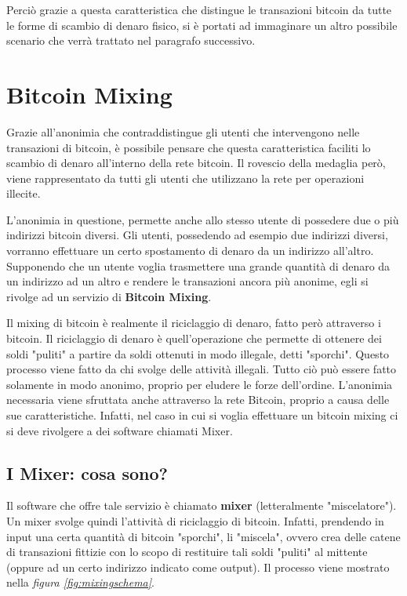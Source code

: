Perciò grazie a questa caratteristica che distingue le transazioni bitcoin da tutte le forme di scambio di denaro fisico, si è portati ad immaginare un altro possibile scenario che verrà trattato nel paragrafo successivo.

\section{Bitcoin Mixing}

Grazie all'anonimia che contraddistingue gli utenti che intervengono nelle transazioni di bitcoin, è possibile pensare che questa caratteristica faciliti lo scambio di denaro all'interno della rete bitcoin. Il rovescio della medaglia però, viene rappresentato da tutti gli utenti che utilizzano la rete per operazioni illecite.

L'anonimia in questione, permette anche allo stesso utente di possedere due o più indirizzi bitcoin diversi. Gli utenti, possedendo ad esempio due indirizzi diversi, vorranno effettuare un certo spostamento di denaro da un indirizzo all'altro. Supponendo che un utente voglia trasmettere una grande quantità di denaro da un indirizzo ad un altro e rendere le transazioni ancora più anonime, egli si rivolge ad un servizio di \textbf{Bitcoin Mixing}.

Il mixing di bitcoin è realmente il riciclaggio di denaro, fatto però attraverso i bitcoin. Il riciclaggio di denaro è quell'operazione che permette di ottenere dei soldi "puliti" a partire da soldi ottenuti in modo illegale, detti "sporchi". Questo processo viene fatto da chi svolge delle attività illegali. Tutto ciò può essere fatto solamente in modo anonimo, proprio per eludere le forze dell'ordine. L'anonimia necessaria viene sfruttata anche attraverso la rete Bitcoin, proprio a causa delle sue caratteristiche. Infatti, nel caso in cui si voglia effettuare un bitcoin mixing ci si deve rivolgere a dei software chiamati Mixer.

\subsection{I Mixer: cosa sono?}

Il software che offre tale servizio è chiamato \textbf{mixer} (letteralmente "miscelatore"). Un mixer svolge quindi l'attività di riciclaggio di bitcoin. Infatti, prendendo in input una certa quantità di bitcoin "sporchi", li "miscela", ovvero crea delle catene di transazioni fittizie con lo scopo di restituire tali soldi "puliti" al mittente (oppure ad un certo indirizzo indicato come output). Il processo viene mostrato nella \textit{figura \ref{fig:mixingschema}}.

